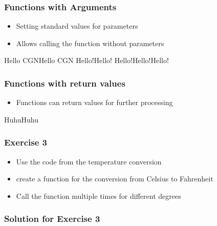 \documentclass[english]{beamer}
\newcommand{\ta}[1]{\textattachfile[color=1 0 0]{#1}{Code}}
\begin{document}
\begin{frame}[containsverbatim]
\frametitle{Functions with Arguments}

\begin{itemize}
	\item Setting standard values for parameters
	\item Allows calling the function without parameters
\end{itemize}



\begin{ausgabe}
Hello CGNHello CGN
Hello!Hello!
Hello!Hello!Hello!
\end{ausgabe}

\end{frame}

\begin{frame}[containsverbatim]
\frametitle{Functions with return values}

\begin{itemize}
	\item Functions can return values for further processing
\end{itemize}



\begin{ausgabe}
HuhuHuhu
\end{ausgabe}

\end{frame}


\begin{frame}
\frametitle{Exercise 3}

\begin{itemize}
\item Use the code from the temperature conversion 
\item create a function for the conversion from Celsius to Fahrenheit
\item Call the function multiple times for different degrees
\end{itemize}
\end{frame}

\begin{frame}[containsverbatim]
\frametitle{Solution for Exercise 3}





\end{frame}
\end{document}
